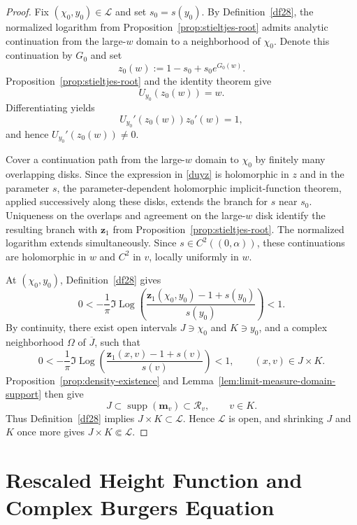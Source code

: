 \documentclass[11pt]{amsart}
\theoremstyle{plain}
\numberwithin{equation}{section}
\numberwithin{theorem}{section}
\numberwithin{figure}{section}
\begin{document}
\begin{proof}
Fix \((\chi_0,y_0)\in\mathcal L\) and set \(s_0=s(y_0)\).
By Definition~\ref{df28}, the normalized logarithm from
Proposition~\ref{prop:stieltjes-root} admits analytic continuation
from the large-\(w\) domain to a neighborhood of \(\chi_0\).
Denote this continuation by \(G_0\) and set
\[
    z_0(w):=1-s_0+s_0e^{G_0(w)}.
\]
Proposition~\ref{prop:stieltjes-root} and the identity theorem give
\[
    U_{y_0}(z_0(w))=w.
\]
Differentiating yields
\[
    U_{y_0}'(z_0(w))z_0'(w)=1,
\]
and hence \(U_{y_0}'(z_0(w))\neq0\).

Cover a continuation path from the large-\(w\) domain to
\(\chi_0\) by finitely many overlapping disks. Since the expression
in \eqref{duyz} is holomorphic in \(z\) and in the parameter \(s\),
the parameter-dependent holomorphic implicit-function theorem,
applied successively along these disks, extends the branch for
\(s\) near \(s_0\). Uniqueness on the overlaps and agreement on the
large-\(w\) disk identify the resulting branch with
\(\mathbf z_1\) from Proposition~\ref{prop:stieltjes-root}. The
normalized logarithm extends simultaneously. Since
\(s\in C^2((0,\alpha))\), these continuations are holomorphic in
\(w\) and \(C^2\) in \(v\), locally uniformly in \(w\).

At \((\chi_0,y_0)\), Definition~\ref{df28} gives
\[
    0<
    -\frac1\pi
    \Im\operatorname{Log}\left(
        \frac{\mathbf z_1(\chi_0,y_0)-1+s(y_0)}{s(y_0)}
    \right)
    <1.
\]
By continuity, there exist open intervals \(J\ni\chi_0\) and
\(K\ni y_0\), and a complex neighborhood \(\Omega\) of
\(\overline J\), such that
\begin{equation}
    0<
    -\frac1\pi
    \Im\operatorname{Log}\left(
        \frac{\mathbf z_1(x,v)-1+s(v)}{s(v)}
    \right)
    <1,
    \qquad (x,v)\in J\times K.
    \label{eq:joint-liquid-density-bounds}
\end{equation}
Proposition~\ref{prop:density-existence} and
Lemma~\ref{lem:limit-measure-domain-support} then give
\[
    J\subset\operatorname{supp}(\mathbf m_v)
    \subset\mathcal R_v,
    \qquad v\in K.
\]
Thus Definition~\ref{df28} implies
\(J\times K\subset\mathcal L\). Hence \(\mathcal L\) is open, and
shrinking \(J\) and \(K\) once more gives
\(J\times K\Subset\mathcal L\).
\end{proof}


\section{Rescaled Height Function and Complex Burgers Equation}\label{sect:be}
\end{document}
